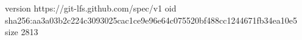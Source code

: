 version https://git-lfs.github.com/spec/v1
oid sha256:aa3a03b2c224c3093025cac1ce9e96e64c075520bf488cc1244671fb34ea10e5
size 2813
